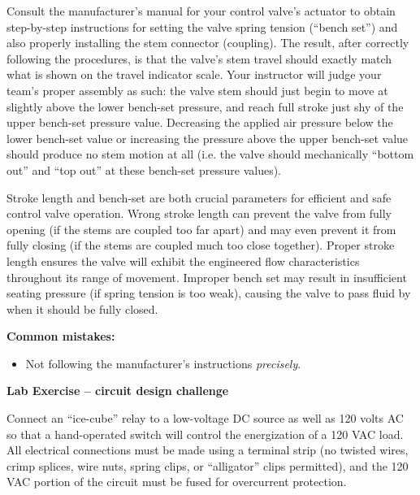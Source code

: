 \vskip 10pt

Consult the manufacturer's manual for your control valve's actuator to obtain step-by-step instructions for setting the valve spring tension (``bench set'') and also properly installing the stem connector (coupling).  The result, after correctly following the procedures, is that the valve's stem travel should exactly match what is shown on the travel indicator scale.  Your instructor will judge your team's proper assembly as such: the valve stem should just begin to move at slightly above the lower bench-set pressure, and reach full stroke just shy of the upper bench-set pressure value.  Decreasing the applied air pressure below the lower bench-set value or increasing the pressure above the upper bench-set value should produce no stem motion at all (i.e. the valve should mechanically ``bottom out'' and ``top out'' at these bench-set pressure values).

\vskip 10pt

Stroke length and bench-set are both crucial parameters for efficient and safe control valve operation.  Wrong stroke length can prevent the valve from fully opening (if the stems are coupled too far apart) and may even prevent it from fully closing (if the stems are coupled much too close together).  Proper stroke length ensures the valve will exhibit the engineered flow characteristics throughout its range of movement.  Improper bench set may result in insufficient seating pressure (if spring tension is too weak), causing the valve to pass fluid by when it should be fully closed.

\vskip 10pt

{\bf Common mistakes:}

\begin{itemize}
\item{} Not following the manufacturer's instructions {\it precisely}.
\end{itemize}






\vfil \eject

\noindent
{\bf Lab Exercise -- circuit design challenge}

\vskip 5pt

Connect an ``ice-cube'' relay to a low-voltage DC source as well as 120 volts AC so that a hand-operated switch will control the energization of a 120 VAC load.  All electrical connections must be made using a terminal strip (no twisted wires, crimp splices, wire nuts, spring clips, or ``alligator'' clips permitted), and the 120 VAC portion of the circuit must be fused for overcurrent protection.

